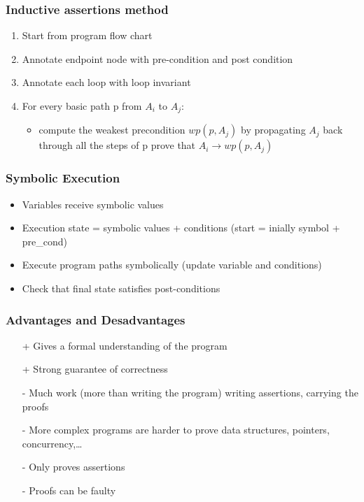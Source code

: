 \subsubsection{Inductive assertions method}
\begin{enumerate}
	\item Start from program flow chart
	\item Annotate endpoint node with pre-condition and post condition
	\item Annotate each loop with loop invariant
	\item For every basic path p from $A_i$ to $A_j$:
	\begin{itemize}
		\item compute the weakest precondition $wp(p,A_j)$ by propagating $A_j$
		back through all the steps of p prove that $A_i \rightarrow wp(p,A_j)$
	\end{itemize}
\end{enumerate}

\subsubsection{Symbolic Execution}
\begin{itemize}
	\item Variables receive symbolic values
	\item Execution state = symbolic values + conditions (start = inially symbol + pre\_cond)
	\item Execute program paths symbolically (update variable and conditions)
	\item Check that final state satisfies post-conditions
\end{itemize}

\subsubsection{Advantages and Desadvantages}
\begin{itemize}
    \item[+] Gives a formal understanding of the program
    \item[+] Strong guarantee of correctness
    \item[-] Much work (more than writing the program) writing assertions, carrying the proofs
    \item[-] More complex programs are harder to prove data structures, pointers, concurrency,\ldots
    \item[-] Only proves assertions
    \item[-] Proofs can be faulty
\end{itemize}

